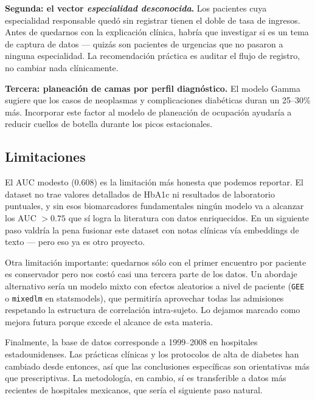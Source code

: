 \documentclass[conference]{IEEEtran}
\begin{document}
\textbf{Segunda: el vector \textit{especialidad desconocida}.} Los pacientes cuya especialidad responsable quedó sin registrar tienen el doble de tasa de ingresos. Antes de quedarnos con la explicación clínica, habría que investigar si es un tema de captura de datos --- quizás son pacientes de urgencias que no pasaron a ninguna especialidad. La recomendación práctica es auditar el flujo de registro, no cambiar nada clínicamente.

\textbf{Tercera: planeación de camas por perfil diagnóstico.} El modelo Gamma sugiere que los casos de neoplasmas y complicaciones diabéticas duran un 25--30\% más. Incorporar este factor al modelo de planeación de ocupación ayudaría a reducir cuellos de botella durante los picos estacionales.

\subsection*{Limitaciones}
El AUC modesto (0.608) es la limitación más honesta que podemos reportar. El dataset no trae valores detallados de HbA1c ni resultados de laboratorio puntuales, y sin esos biomarcadores fundamentales ningún modelo va a alcanzar los AUC $> 0.75$ que sí logra la literatura con datos enriquecidos. En un siguiente paso valdría la pena fusionar este dataset con notas clínicas vía embeddings de texto --- pero eso ya es otro proyecto.

Otra limitación importante: quedarnos sólo con el primer encuentro por paciente es conservador pero nos costó casi una tercera parte de los datos. Un abordaje alternativo sería un modelo mixto con efectos aleatorios a nivel de paciente (\texttt{GEE} o \texttt{mixedlm} en statsmodels), que permitiría aprovechar todas las admisiones respetando la estructura de correlación intra-sujeto. Lo dejamos marcado como mejora futura porque excede el alcance de esta materia.

Finalmente, la base de datos corresponde a 1999--2008 en hospitales estadounidenses. Las prácticas clínicas y los protocolos de alta de diabetes han cambiado desde entonces, así que las conclusiones específicas son orientativas más que prescriptivas. La metodología, en cambio, sí es transferible a datos más recientes de hospitales mexicanos, que sería el siguiente paso natural.
\end{document}
